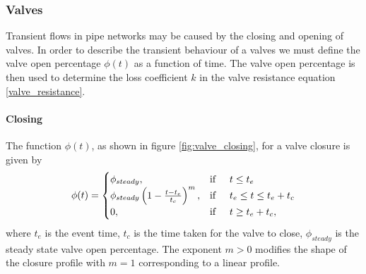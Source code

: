 \subsubsection{Valves}

Transient flows in pipe networks may be caused by the closing and opening of valves. In order to describe the transient behaviour of a valves we must define the valve open percentage $\phi(t)$ as a function of time. The valve open percentage is then used to determine the loss coefficient $k$ in the valve resistance equation \eqref{valve_resistance}.

\paragraph{Closing}
 
 The function $\phi(t)$, as shown in figure \ref{fig:valve_closing}, for a valve closure is given by 
\begin{align}\label{valve_closure_function}
\phi(t) = 
\begin{cases} 
\phi_{steady}, &\text{if} \hspace{0.5cm} t \leq t_e \\
\phi_{steady} \left( 1 - \frac{t-t_e}{t_c} \right)^m, &\text{if} \hspace{0.5cm} t_e \leq t \leq t_e + t_c \\
0, &\text{if} \hspace{0.5cm} t \geq t_e + t_c, 
\end{cases}
\end{align} 
where $t_e$ is the event time, $t_c$ is the time taken for the valve to close, $\phi_{steady}$ is the steady state valve open percentage. The exponent $m > 0$ modifies the shape of the closure profile with $m=1$ corresponding to a linear profile. 
 
